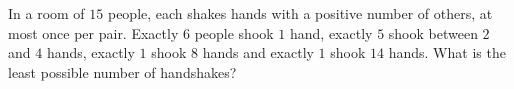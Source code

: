 In a room of $15$ people, each shakes hands with a positive number of others, at most once per pair. Exactly $6$ people shook $1$ hand, exactly $5$ shook between $2$ and $4$ hands, exactly $1$ shook $8$ hands and exactly $1$ shook $14$ hands. What is the least possible number of handshakes?
